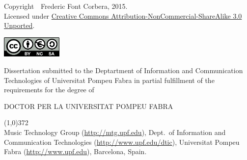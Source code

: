 \cleartorecto
\thispagestyle{empty}

{\footnotesize Copyright~\textcopyright~Frederic Font Corbera, 2015.}
\\{\footnotesize Licensed under \href{http://creativecommons.org/licenses/by-nc-sa/3.0/}{Creative Commons Attribution-NonCommercial-ShareAlike 3.0 Unported}.}

\href{http://creativecommons.org/licenses/by-nc-sa/3.0/}{\includegraphics[width=3cm]{ch00_pics/creative-commons2.png}}


\vspace*{5cm}


Dissertation submitted to the Deptartment of Information and Communication Technologies of Universitat Pompeu Fabra in partial fulfillment of the requirements for the degree of

\vspace*{0.5cm}

\centerline{DOCTOR PER LA UNIVERSITAT POMPEU FABRA}

\vspace*{0.6cm}



\vspace*{\fill}

\line(1,0){372}\\
\footnotesize
Music Technology Group (\url{http://mtg.upf.edu}), Dept.~of Information and Communication Technologies (\url{http://www.upf.edu/dtic}), Universitat Pompeu Fabra (\url{http://www.upf.edu}), Barcelona, Spain.
\normalsize


%




